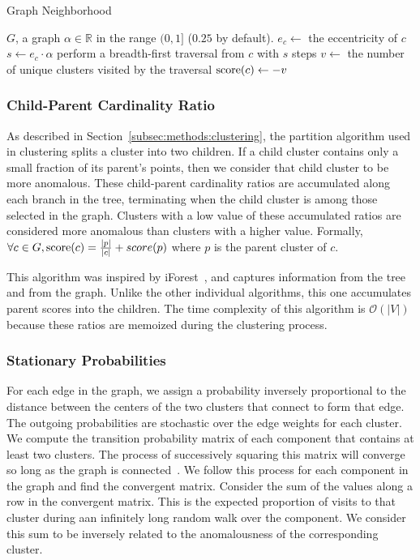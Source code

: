 \begin{algorithm}[h]
    \caption{Graph Neighborhood}
    \label{alg:graph-neighborhood-size}
\begin{algorithmic}[1]
    \REQUIRE $G$, a graph
    \REQUIRE $\alpha \in \mathbb{R}$ in the range $(0,1]$ ($0.25$ by default).
        \STATE $e_c \gets$ the eccentricity of $c$
        \STATE $s \gets e_c \cdot \alpha$
        \STATE perform a breadth-first traversal from $c$ with $s$ steps
        \STATE $v \gets$ the number of unique clusters visited by the traversal
        \STATE $\operatorname{score}(c) \gets -v$
    \ENDFOR
\end{algorithmic}
\end{algorithm}


\subsubsection{Child-Parent Cardinality Ratio}
\label{subsubsec:methods:individual-algorithms:child-parent-cardinality-ratio}
As described in Section~\ref{subsec:methods:clustering}, the partition algorithm used in clustering splits a cluster into two children.
If a child cluster contains only a small fraction of its parent's points, then we consider that child cluster to be more anomalous.
These child-parent cardinality ratios are accumulated along each branch in the tree, terminating when the child cluster is among those selected in the graph.
Clusters with a low value of these accumulated ratios are considered more anomalous than clusters with a higher value.
Formally, $\forall c \in G, \operatorname{score}(c) = \frac{|p|}{|c|} + score(p)$ where $p$ is the parent cluster of $c$.

This algorithm was inspired by iForest~\cite{tony2008iforest}, and captures information from the tree and from the graph.
Unlike the other individual algorithms, this one accumulates parent scores into the children.
The time complexity of this algorithm is $\mathcal{O}(|V|)$ because these ratios are memoized during the clustering process.


\subsubsection{Stationary Probabilities}
\label{subsubsec:methods:individual-algorithms:stationary-probabilities}
For each edge in the graph, we assign a probability inversely proportional to the distance between the centers of the two clusters that connect to form that edge.
The outgoing probabilities are stochastic over the edge weights for each cluster.
We compute the transition probability matrix of each component that contains at least two clusters.
The process of successively squaring this matrix will converge so long as the graph is connected~\cite{levin2017markov}.
We follow this process for each component in the graph and find the convergent matrix.
Consider the sum of the values along a row in the convergent matrix.
This is the expected proportion of visits to that cluster during aan infinitely long random walk over the component.
We consider this sum to be inversely related to the anomalousness of the corresponding cluster.

